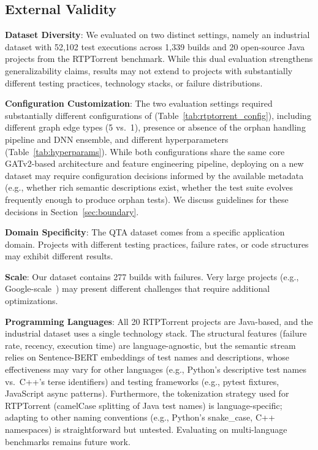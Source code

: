 \subsection{External Validity}

\textbf{Dataset Diversity}: We evaluated on two distinct settings, namely an
industrial dataset with 52,102 test executions across 1,339 builds and 20
open-source Java projects from the RTPTorrent benchmark. While this dual
evaluation strengthens generalizability claims, results may not extend to
projects with substantially different testing practices, technology stacks,
or failure distributions.

\textbf{Configuration Customization}: The two evaluation settings required
substantially different configurations of \filopriori{}
(Table~\ref{tab:rtptorrent_config}), including different graph edge types
(5 vs.\ 1), presence or absence of the orphan handling pipeline and DNN
ensemble, and different hyperparameters
(Table~\ref{tab:hyperparams}). While both configurations share the same core
GATv2-based architecture and feature engineering pipeline, deploying
\filopriori{} on a new dataset may require configuration decisions informed by
the available metadata (e.g., whether rich semantic descriptions exist,
whether the test suite evolves frequently enough to produce orphan tests).
We discuss guidelines for these decisions in
Section~\ref{sec:boundary}.

\textbf{Domain Specificity}: The QTA dataset comes from a specific application
domain. Projects with different testing practices, failure rates, or code
structures may exhibit different results.

\textbf{Scale}: Our dataset contains 277 builds with failures. Very large
projects (e.g., Google-scale~\cite{memon2017taming}) may present different
challenges that require additional optimizations.

\textbf{Programming Languages}: All 20 RTPTorrent projects are Java-based,
and the industrial dataset uses a single technology stack. The structural
features (failure rate, recency, execution time) are language-agnostic, but
the semantic stream relies on Sentence-BERT embeddings of test names and
descriptions, whose effectiveness may vary for other languages (e.g.,
Python's descriptive test names vs.\ C++'s terse identifiers) and testing
frameworks (e.g., pytest fixtures, JavaScript async patterns). Furthermore,
the tokenization strategy used for RTPTorrent (camelCase splitting of Java
test names) is language-specific; adapting to other naming conventions
(e.g., Python's snake\_case, C++ namespaces) is straightforward but
untested. Evaluating \filopriori{} on multi-language benchmarks remains
future work.


